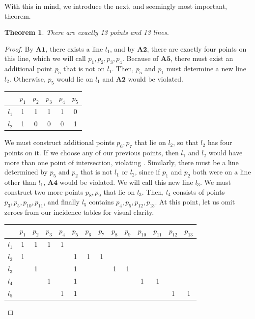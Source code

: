 \documentclass{article}
\newtheorem{theorem}{Theorem}[section]
\begin{document}
 With this in mind, we introduce the next, and seemingly most important, theorem.
 \begin{theorem}
 There are exactly 13 points and 13 lines.
 \end{theorem}
 
 \begin{proof}
 By $\mathbf{A1}$, there exists a line $l_1$, and by $\mathbf{A2}$, there are exactly four points on this line, which we will call $p_1, p_2, p_3, p_4$. Because of $\mathbf{A5}$, there must exist an additional point $p_5$ that is not on $l_1$. Then, $p_5$ and $p_1$ must determine a new line $l_2$. Otherwise, $p_5$ would lie on $l_1$ and $\mathbf{A2}$ would be violated. 
 \begin{center}
\begin{tabular}{ c|c|c|c|c|c } 
 
  & $p_1$ & $p_2$ & $p_3$ &$p_4$ &$p_5$\\ 
 \hline
 $l_1$ & 1 & 1 & 1 & 1 & 0\\
 \hline
 $l_2$ & 1 & 0 & 0 & 0& 1\\
\end{tabular}
\end{center}
We must construct additional points $p_6, p_7$ that lie on $l_2$, so that $l_2$ has four points on it. If we choose any of our previous points, then $l_1$ and $l_2$ would have more than one point of intersection, violating . Similarly, there must be a line determined by $p_5$ and $p_2$ that is not $l_1$ or $l_2$, since if $p_1$ and $p_2$ both were on a line other than $l_1$, $\mathbf{A4}$ would be violated. We will call this new line $l_3$. We must construct two more points $p_8, p_9$ that lie on $l_3$. Then, $l_4$ consists of points $p_3, p_5, p_{10}, p_{11}$, and finally $l_5$ contains $p_4, p_5, p_{12}, p_{13}$. At this point, let us omit zeroes from our incidence tables for visual clarity.
\begin{center}
\begin{tabular}{ c|c|c|c|c|c|c|c|c|c|c|c|c|c } 
 
  & $p_1$ & $p_2$ & $p_3$ &$p_4$ &$p_5$ &$p_6$ &$p_7$ &$p_8$ &$p_9$  &$p_{10}$&$p_{11}$&$p_{12}$&$p_{13}$ \\ 
\hline
 $l_1$ & 1 & 1 & 1 & 1 &  &&& &&&&& \\ 
 \hline
 $l_2$ & 1 & &&&1&1&1&&&&&& \\
 \hline
 $l_3$ & &1&&&1&&&1&1&&&&\\
 \hline
 $l_4$ &  &  & 1 &  &1 & &&&&1&1&&\\
 \hline
 $l_5$ & &&&1&1&&&&&&&1&1\\



\end{tabular}
\end{center}
\end{proof}
\end{document}
